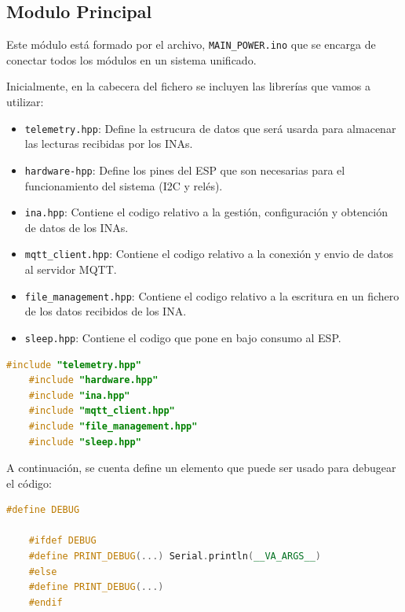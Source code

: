 \subsection{Modulo Principal}

Este módulo está formado por el archivo, \texttt{MAIN\_POWER.ino} que se encarga de conectar todos los módulos en un sistema unificado.

Inicialmente, en la cabecera del fichero se incluyen las librerías que vamos a utilizar:
\begin{itemize}
    \item \texttt{telemetry.hpp}: Define la estrucura de datos que será usarda para almacenar las lecturas recibidas por los INAs.
    \item \texttt{hardware-hpp}: Define los pines del ESP que son necesarias para el funcionamiento del sistema (I2C y relés).
    \item \texttt{ina.hpp}: Contiene el codigo relativo a la gestión, configuración y obtención de datos de los INAs. 
    \item \texttt{mqtt\_client.hpp}: Contiene el codigo relativo a la conexión y envio de datos al servidor MQTT.
    \item \texttt{file\_management.hpp}: Contiene el codigo relativo a la escritura en un fichero de los datos recibidos de los INA.
    \item \texttt{sleep.hpp}: Contiene el codigo que pone en bajo consumo al ESP.
\end{itemize}

\begin{lstlisting}[captionpos=b, caption={Cabecera con los módulos y ficheros utilizados}, language=c++]
    #include "telemetry.hpp"
    #include "hardware.hpp"
    #include "ina.hpp"
    #include "mqtt_client.hpp"
    #include "file_management.hpp"
    #include "sleep.hpp"
\end{lstlisting}

A continuación, se cuenta define un elemento que puede ser usado para debugear el código:
\begin{lstlisting}[captionpos=b, caption={Definición del debuger}, language=c++]
    #define DEBUG

    #ifdef DEBUG
    #define PRINT_DEBUG(...) Serial.println(__VA_ARGS__)
    #else
    #define PRINT_DEBUG(...)
    #endif    
\end{lstlisting}

